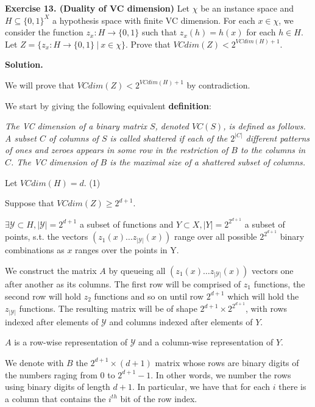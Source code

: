 \documentclass{article}
\newcommand{\<}{\langle}
\renewcommand{\>}{\rangle}
\theoremstyle{definition}
\begin{document}
\textbf{Exercise 13. (Duality of VC dimension)} Let $\chi$ be an instance space and $H \subseteq \{0,1\}^X$ a hypothesis space with finite VC dimension. For each $x \in \chi$, we consider the function $z_x : H \rightarrow \{0,1\}$ such that $z_x(h) = h(x)$ for each $h \in H$. Let $Z = \{z_x : H \rightarrow \{0,1\} \ | \ x \in \chi\}$. Prove that $VCdim(Z) < 2^{VCdim(H) + 1}$.

\textbf{Solution.}

We will prove that $VCdim(Z) < 2^{VCdim(H) + 1}$ by contradiction.

We start by giving the following equivalent \textbf{definition}\cite{signvcvcdim}:

\textit{The VC dimension of a binary matrix $S$, denoted $VC(S)$, is defined as follows. A subset $C$ of columns of $S$ is called shattered if each of the $2^{|C|}$ different patterns of ones and zeroes appears in some row in the restriction of $B$ to the columns in $C$. The VC dimension of $B$ is the maximal size of a shattered subset of columns.} 

Let $VCdim(H) = d$. \hspace{7.7cm} (1)

Suppose that $VCdim(Z) \geq 2^{d+1}$. 

$\exists \mathcal{Y} \subset H, |\mathcal{Y}|=2^{d+1}$ a subset of functions and $Y \subset X, |Y| = 2^{2^{d+1}}$ a subset of points, s.t. the vectors $(z_1(x) \dots z_{|\mathcal{Y}|}(x))$ range over all possible $2^{2^{d+1}}$ binary combinations as $x$ ranges over the points in Y. 

We construct the matrix $A$ by queueing all $(z_1(x) \dots z_{|\mathcal{Y}|}(x))$ vectors one after another as its columns. The  first row will be comprised of $z_1$ functions, the second row will hold $z_2$ functions and so on until row $2^{d+1}$ which will hold the $z_{|\mathcal{Y}|}$ functions. The resulting matrix will be of shape $2^{d+1} \times 2^{2^{d+1}}$, with rows indexed after elements of $\mathcal{Y}$ and columns indexed after elements of $Y$. 

$A$ is a row-wise representation of $\mathcal{Y}$ and a column-wise representation of $Y$.

We denote with $B$ the $2^{d+1} \times (d+1)$ matrix whose rows are binary digits of the numbers raging from 0 to $2^{d+1} - 1$. In other words, we number the rows using binary digits of length $d+1$. In particular, we have that for each $i$ there is a column that contains the $i^{th}$ bit of the row index.
\end{document}
